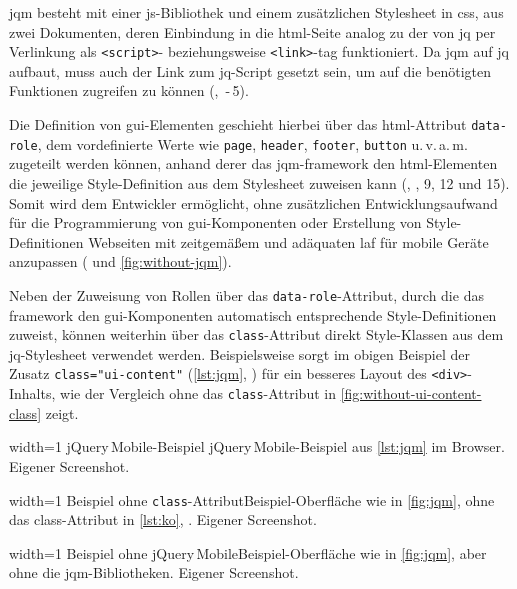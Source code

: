 \Gls{jqm} besteht mit einer \gls{js}-Bibliothek und einem zusätzlichen Stylesheet in \gls{css}, aus zwei Dokumenten, deren Einbindung in die \gls{html}-Seite analog zu der von \gls{jq} per Verlinkung als \lstinline|<script>|- beziehungsweise \lstinline|<link>|-\gls{tag} funktioniert.
Da \gls{jqm} auf \gls{jq} aufbaut, muss auch der Link zum \gls{jq}-Script gesetzt sein, um auf die benötigten Funktionen zugreifen zu können (, \,-\,5).

	
Die Definition von \gls{gui}-Elementen geschieht hierbei über das \gls{html}-Attribut \lstinline|data-role|, dem vordefinierte Werte wie \lstinline|page|, \lstinline|header|, \lstinline|footer|, \lstinline|button| u.\,v.\,a.\,m. zugeteilt werden können, anhand derer das \gls{jqm}-\gls{framework} den \gls{html}-Elementen die jeweilige Style-Definition aus dem Stylesheet zuweisen kann (, , 9, 12 und 15).
Somit wird dem Entwickler ermöglicht, ohne zusätzlichen Entwicklungsaufwand für die Programmierung von \gls{gui}-Komponenten oder Erstellung von Style-Definitionen Webseiten mit zeitgemäßem und adäquaten \gls{laf} für mobile Geräte anzupassen ( und \ref{fig:without-jqm}).

Neben der Zuweisung von Rollen über das \lstinline|data-role|-Attribut, durch die das \gls{framework} den \gls{gui}-Komponenten automatisch entsprechende Style-Definitionen zuweist, können weiterhin über das \lstinline|class|-Attribut direkt Style-Klassen aus dem \gls{jq}-Stylesheet verwendet werden.
Beispielsweise sorgt im obigen Beispiel der Zusatz \lstinline|class="ui-content"| (\autoref{lst:jqm}, ) für ein besseres Layout des \lstinline|<div>|-Inhalts, wie der Vergleich ohne das \lstinline|class|-Attribut in \autoref{fig:without-ui-content-class} zeigt.


	{width=1\textwidth}
	{jQuery\,\-Mobile-Beispiel}
	{jQuery\,\-Mobile-Beispiel aus \autoref{lst:jqm} im Browser.}
	{Eigener Screenshot.}

	{width=1\textwidth}
	{Beispiel ohne \lstinline|class|-Attribut}{Beispiel-Oberfläche wie in \autoref{fig:jqm}, ohne das class-Attribut in \autoref{lst:ko}, .}
	{Eigener Screenshot.}

	{width=1\textwidth}
	{Beispiel ohne jQuery\,\-Mobile}{Beispiel-Oberfläche wie in \autoref{fig:jqm}, aber ohne die \gls{jqm}-Bibliotheken.}
	{Eigener Screenshot.}

